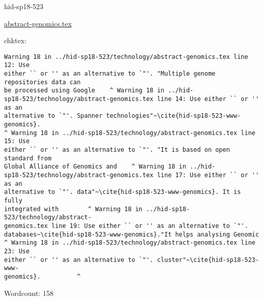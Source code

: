 \begin{IU}

hid-sp18-523

\href{https://github.com/cloudmesh-community/hid-sp18-523/blob/master//technology/abstract-genomics.tex}{abstract-genomics.tex}

 
chktex:
\begin{tiny}
\begin{verbatim}
Warning 18 in ../hid-sp18-523/technology/abstract-genomics.tex line 12: Use
either `` or '' as an alternative to `"'. "Multiple genome repositories data can
be processed using Google    ^ Warning 18 in ../hid-
sp18-523/technology/abstract-genomics.tex line 14: Use either `` or '' as an
alternative to `"'. Spanner technologies"~\cite{hid-sp18-523-www-genomics}.
^ Warning 18 in ../hid-sp18-523/technology/abstract-genomics.tex line 15: Use
either `` or '' as an alternative to `"'. "It is based on open standard from
Global Alliance of Genomics and    ^ Warning 18 in ../hid-
sp18-523/technology/abstract-genomics.tex line 17: Use either `` or '' as an
alternative to `"'. data"~\cite{hid-sp18-523-www-genomics}. It is fully
integrated with        ^ Warning 18 in ../hid-sp18-523/technology/abstract-
genomics.tex line 19: Use either `` or '' as an alternative to `"'.
databases~\cite{hid-sp18-523-www-genomics}."It helps analysing Genomic
^ Warning 18 in ../hid-sp18-523/technology/abstract-genomics.tex line 23: Use
either `` or '' as an alternative to `"'. cluster"~\cite{hid-sp18-523-www-
genomics}.          ^
\end{verbatim}
\end{tiny}

Wordcount: 158

\end{IU}



